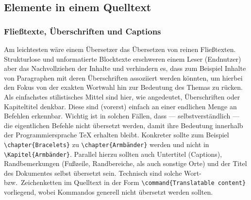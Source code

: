 


\newpage




\subsection{Elemente in einem Quelltext}


\subsubsection{Fließtexte, Überschriften und Captions}\label{subsubsec:problems:texts}%
Am leichtesten wäre einem Übersetzer das Übersetzen von reinen Fließtexten. Strukturlose und unformatierte Blocktexte erschweren einem Leser (Endnutzer) aber das Nachvollziehen der Inhalte und verhindern es, dass zum Beispiel Inhalte von Paragraphen mit deren Überschriften assoziiert werden könnten, um hierbei den Fokus von der exakten Wortwahl hin zur Bedeutung des Themas zu rücken.%
Als einfachstes stilistisches Mittel sind hier, wie angedeutet, Überschriften oder Kapiteltitel denkbar. Diese sind (vorerst) einfach an einer endlichen Menge an Befehlen erkennbar. Wichtig ist in solchen Fällen, dass --- selbstverständlich --- die eigentlichen Befehle nicht übersetzt werden, damit ihre Bedeutung innerhalb der Programmiersprache \TeX{} erhalten bleibt. Konkreter sollte zum Beispiel \verb|\chapter{Bracelets}| zu \verb|\chapter{Armbänder}| werden und nicht in \verb|\Kapitel{Armbänder}|.
Parallel hierzu sollten auch Untertitel (Captions), Randbemerkungen (Fußzeile, Randbereiche, als auch sonstige Orte) und der Titel des Dokumentes selbst übersetzt sein. Technisch sind solche Wort- bzw.\ Zeichenketten im Quelltext in der Form \verb|\command{Translatable content}| vorliegend, wobei Kommandos generell nicht übersetzt werden sollten.


